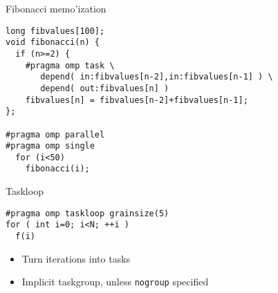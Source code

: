 \begin{numberedframe}{Fibonacci memo'ization}
\begin{lstlisting}
long fibvalues[100];
void fibonacci(n) {
  if (n>=2) {
    #pragma omp task \
       depend( in:fibvalues[n-2],in:fibvalues[n-1] ) \
       depend( out:fibvalues[n] )
    fibvalues[n] = fibvalues[n-2]+fibvalues[n-1];
};

#pragma omp parallel
#pragma omp single
  for (i<50)
    fibonacci(i);
\end{lstlisting}
\end{numberedframe}


\begin{numberedframe}{Taskloop}
\begin{lstlisting}
#pragma omp taskloop grainsize(5)
for ( int i=0; i<N; ++i )
  f(i)
\end{lstlisting}
  \begin{itemize}
  \item Turn iterations into tasks
  \item Implicit taskgroup, unless \lstinline{nogroup} specified
  \end{itemize}
\end{numberedframe}

\endinput

\begin{numberedframe}{}
\begin{lstlisting}
\end{lstlisting}
  \begin{itemize}
  \item 
  \end{itemize}
\end{numberedframe}

